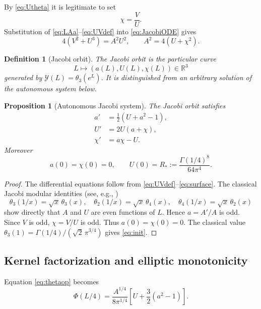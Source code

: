 \documentclass[10pt,a4paper]{amsart}
\numberwithin{equation}{section}
\newtheorem{proposition}[theorem]{Proposition}
\newtheorem{definition}[theorem]{Definition}
\newcommand{\Rstar}{R_*}
\begin{document}
By \eqref{eq:Utheta} it is legitimate to set
\begin{equation}\label{eq:chi}
 \chi=\frac VU.
\end{equation}
Substitution of \eqref{eq:LAa}--\eqref{eq:UVdef} into \eqref{eq:JacobiODE} gives
\begin{equation}\label{eq:surface}
 4(V^2+U^3)=A^2U^2,
 \qquad
 A^2=4(U+\chi^2).
\end{equation}

\begin{definition}[Jacobi orbit]
The \emph{Jacobi orbit} is the particular curve
\[
 L\longmapsto(a(L),U(L),\chi(L))\in\mathbb R^3
\]
generated by $\mathscr Y(L)=\theta_3(e^L)$.  It is distinguished from an arbitrary solution of the autonomous system below.
\end{definition}

\begin{proposition}[Autonomous Jacobi system]\label{prop:flow}
The Jacobi orbit satisfies
\begin{equation}\label{eq:flow}
 \boxed{\begin{aligned}
 a'&=\tfrac12(U+a^2-1),\\
 U'&=2U(a+\chi),\\
 \chi'&=a\chi-U.
 \end{aligned}}
\end{equation}
Moreover
\begin{equation}\label{eq:init}
 a(0)=\chi(0)=0,\qquad
 U(0)=\Rstar:=\frac{\Gamma(1/4)^8}{64\pi^4}.
\end{equation}
\end{proposition}
\begin{proof}
The differential equations follow from \eqref{eq:UVdef}--\eqref{eq:surface}.  The classical Jacobi modular identities (see, e.g., \cite{DLMF20,ConwaySloane1999})
\[
 \theta_3(1/x)=\sqrt{x}\,\theta_3(x),\quad
 \theta_2(1/x)=\sqrt{x}\,\theta_4(x),\quad
 \theta_4(1/x)=\sqrt{x}\,\theta_2(x)
\]
show directly that $A$ and $U$ are even functions of $L$.  Hence $a=A'/A$ is odd.  Since $V$ is odd, $\chi=V/U$ is odd.  Thus $a(0)=\chi(0)=0$.  The classical value $\theta_3(1)=\Gamma(1/4)/(\sqrt2\,\pi^{3/4})$ gives \eqref{eq:init}.
\end{proof}

\subsection{Kernel factorization and elliptic monotonicity}
Equation \eqref{eq:thetaop} becomes
\begin{equation}\label{eq:kernelAU}
 \Phi(L/4)=\frac{A^{1/4}}{8\pi^{1/4}}
 \left[U+\frac32(a^2-1)\right].
\end{equation}
\end{document}
